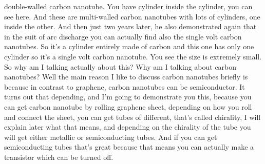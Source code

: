 double-walled carbon nanotube. You have cylinder inside the cylinder, you can see here. And these are multi-walled carbon nanotubes with lots of cylinders, one inside the other. And then just two years later, he also demonstrated again that in the suit of arc discharge you can actually find also the single volt carbon nanotubes. So it's a cylinder entirely made of carbon and this one has only one cylinder so it's a single volt carbon nanotube. You see the size is extremely small. So why am I talking actually about this? Why am I talking about carbon nanotubes? Well the main reason I like to discuss carbon nanotubes briefly is because in contrast to graphene, carbon nanotubes can be semiconductor. It turns out that depending, and I'm going to demonstrate you this, because you can get carbon nanotube by rolling graphene sheet, depending on how you roll and connect the sheet, you can get tubes of different, that's called chirality, I will explain later what that means, and depending on the chirality of the tube you will get either metallic or semiconducting tubes. And if you can get semiconducting tubes that's great because that means you can actually make a transistor which can be turned off.
